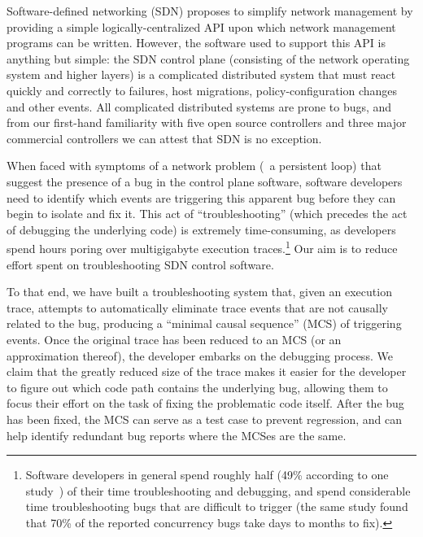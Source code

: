 Software-defined networking (SDN) proposes to simplify network management by
providing a simple logically-centralized API upon which network management
programs can be written. However, the software used to support this API is
anything but simple: the SDN control plane (consisting of the network
operating system and higher layers) is a complicated distributed system that
must react quickly and correctly to failures, host migrations,
policy-configuration changes and other events.
All complicated distributed systems are prone to bugs, and from our first-hand
familiarity with five open source controllers and three major commercial
controllers we can attest that SDN is no exception.

When faced with symptoms of a network problem (\eg~a persistent loop)
that suggest the presence of a bug in the control plane software,
software developers need to identify which events are triggering
this apparent bug before they can begin to isolate and fix it.
This act of ``troubleshooting'' (which precedes the act of debugging the
underlying code) is extremely time-consuming, as developers spend hours poring
over multigigabyte execution traces.\footnote{Software developers in general spend roughly half (49\% according to one
study~\cite{msoft_concurrency}) of their time troubleshooting and debugging, and spend
considerable time troubleshooting bugs that are difficult to trigger (the same study found
that 70\% of the reported concurrency bugs take days to months to fix).}
Our aim is to reduce effort spent on troubleshooting SDN control software.

To that end, we have built a troubleshooting system that,
given an execution trace, attempts to automatically eliminate
trace events that are not causally related to the bug, producing a ``minimal
causal sequence'' (MCS) of triggering events. Once the original trace has
been reduced to an MCS (or an approximation thereof), the developer embarks
on the debugging process. We claim that the greatly reduced size of the
trace makes it easier for the developer to figure out which code path contains
the underlying bug, allowing them to focus their effort on
the task of fixing the problematic code itself. After the bug has been fixed, the MCS
can serve as a test case to prevent regression,
and can help identify redundant bug reports where the MCSes are the same.


